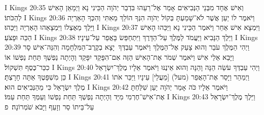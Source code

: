 I Kings 20:35	וְאִישׁ אֶחָד מִבְּנֵי הַנְּבִיאִים אָמַר אֶל־רֵעֵהוּ בִּדְבַר יְהֹוָה הַכֵּינִי נָא וַיְמָאֵן הָאִישׁ לְהַכֹּתוֹ׃
I Kings 20:36	וַיֹּאמֶר לוֹ יַעַן אֲשֶׁר לֹא־שָׁמַעְתָּ בְּקוֹל יְהֹוָה הִנְּךָ הוֹלֵךְ מֵאִתִּי וְהִכְּךָ הָאַרְיֵה וַיֵּלֶךְ מֵאֶצְלוֹ וַיִּמְצָאֵהוּ הָאַרְיֵה וַיַּכֵּהוּ׃
I Kings 20:37	וַיִּמְצָא אִישׁ אַחֵר וַיֹּאמֶר הַכֵּינִי נָא וַיַּכֵּהוּ הָאִישׁ הַכֵּה וּפָצֹעַ׃
I Kings 20:38	וַיֵּלֶךְ הַנָּבִיא וַיַּעֲמֹד לַמֶּלֶךְ עַל־הַדָּרֶךְ וַיִּתְחַפֵּשׂ בָּאֲפֵר עַל־עֵינָיו׃
I Kings 20:39	וַיְהִי הַמֶּלֶךְ עֹבֵר וְהוּא צָעַק אֶל־הַמֶּלֶךְ וַיֹּאמֶר עַבְדְּךָ  יָצָא בְקֶרֶב־הַמִּלְחָמָה וְהִנֵּה־אִישׁ סָר וַיָּבֵא אֵלַי אִישׁ וַיֹּאמֶר שְׁמֹר אֶת־הָאִישׁ הַזֶּה אִם־הִפָּקֵד יִפָּקֵד וְהָיְתָה נַפְשְׁךָ תַּחַת נַפְשׁוֹ אוֹ כִכַּר־כֶּסֶף תִּשְׁקוֹל׃
I Kings 20:40	וַיְהִי עַבְדְּךָ עֹשֵׂה הֵנָּה וָהֵנָּה וְהוּא אֵינֶנּוּ וַיֹּאמֶר אֵלָיו מֶלֶךְ־יִשְׂרָאֵל כֵּן מִשְׁפָּטֶךָ אַתָּה חָרָצְתָּ׃
I Kings 20:41	וַיְמַהֵר וַיָּסַר אֶת־הָאֲפֵר (מעל) [מֵעֲלֵי] עֵינָיו וַיַּכֵּר אֹתוֹ מֶלֶךְ יִשְׂרָאֵל כִּי מֵהַנְּבִיאִים הוּא׃
I Kings 20:42	וַיֹּאמֶר אֵלָיו כֹּה אָמַר יְהֹוָה יַעַן שִׁלַּחְתָּ אֶת־אִישׁ־חֶרְמִי מִיָּד וְהָיְתָה נַפְשְׁךָ תַּחַת נַפְשׁוֹ וְעַמְּךָ תַּחַת עַמּוֹ׃
I Kings 20:43	וַיֵּלֶךְ מֶלֶךְ־יִשְׂרָאֵל עַל־בֵּיתוֹ סַר וְזָעֵף וַיָּבֹא שֹׁמְרוֹנָה׃ {פ}
